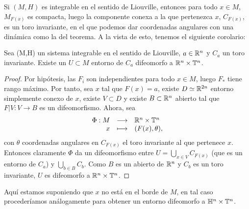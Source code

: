 Si $(M,H)$ es integrable en el sentido de Liouville, entonces para todo $x \in M$, $M_{F(x)}$ es compacta, luego la componente conexa a la que pertenezca $x$, $C_{F(x)}$, es un toro invariante, en el que podemos dar coordenadas angulares con una dinámica como la del teorema. A la vista de esto, tenemos el siguiente corolario:

\begin{corol}
  Sea (M,H) un sistema integrable en el sentido de Liouville, $a \in \mathbb{R}^n$ y $C_a$ un toro invariante. Existe un $U \subset M$ entorno de $C_a$ difeomorfo a $\mathbb{R}^n \times \mathbb{T}^n$. 
\end{corol}

\begin{proof}
  Por hipótesis, las $F_i$ son independientes para todo $x \in M$, luego $F_*$ tiene rango máximo. Por tanto, sea $x$ tal que $F(x)=a$, existe $D\simeq \mathbb{R}^{2n}$ entorno simplemente conexo de $x$, existe $V\subset D$ y existe $B\subset \mathbb{R}^n$ abierto tal que $F|V:V \rightarrow B$ es un difeomorfismo. Ahora, sea
  \[
    \begin{array}{rcl}
      \Phi:M & \longrightarrow & \mathbb{R}^n \times \mathbb{T}^n \\
           x & \longmapsto & (F(x), \theta),
    \end{array}
  \]
  con $\theta$ coordenadas angulares en $C_{F(x)}$ el toro invariante al que pertenece $x$. Entonces claramente $\Phi$ da un difeomorfismo entre $U=\bigcup_{x\in V}C_{F(x)}$ (que es un entorno de $C_a$) y $\bigcup_{b \in B} C_b$. Como $B$ es un abierto de $\mathbb{R}^n$ y $C_b$ es un toro invariante, $U$ es difeomorfo a $\mathbb{R}^n \times \mathbb{T}^n$.
\end{proof}
\begin{obs}
  Aquí estamos suponiendo que $x$ no está en el borde de $M$, en tal caso procederíamos análogamente para obtener un entorno difeomorfo a $\mathbb{H}^n \times \mathbb{T}^n$.
\end{obs}


